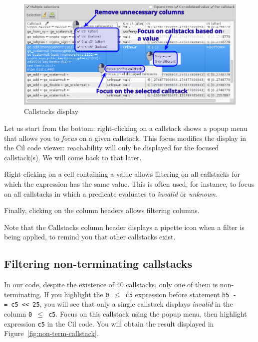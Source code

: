 \begin{figure}[hbtp]
\centering
\includegraphics[width=\textwidth]{gui-images/gui-callstacks-annotated.png}
\caption{Callstacks display}
\label{fig:callstacks}
\end{figure}

Let us start from the bottom: right-clicking on a callstack shows a
popup menu that allows you to \emph{focus} on a given callstack. This
focus modifies the display in the Cil code viewer: reachability will
only be displayed for the focused callstack(s). We will come back to
that later.

Right-clicking on a cell containing a value allows filtering on all
callstacks for which the expression has the same value. This is often
used, for instance, to focus on all callstacks in which a predicate
evaluates to \emph{invalid} or \emph{unknown}.

Finally, clicking on the column headers allows filtering columns.

Note that the Callstacks column header displays a pipette icon when a
filter is being applied, to remind you that other callstacks exist.

\subsection{Filtering non-terminating callstacks}
\label{filtering-non-terminating-callstacks}

In our code, despite the existence of 40 callstacks, only one of them is
non-terminating. If you highlight the \texttt{0\ $\le$\ c5} expression
before statement \texttt{h5\ -=\ c5\ \textless{}\textless{}\ 25}, you
will see that only a single callstack displays \emph{invalid} in the
column \texttt{0\ $\le$\ c5}. Focus on this callstack using the popup menu,
then highlight expression \texttt{c5} in the Cil code. You will obtain
the result displayed in Figure~\ref{fig:non-term-callstack}.

